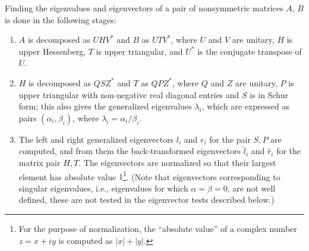\dent
Finding the eigenvalues and eigenvectors of a pair of nonsymmetric
matrices $A$, $B$ is done in the following stages:
\begin{enumerate}

\item $A$ is decomposed as $U H V^*$ and
      $B$ as $U T V^*$, where $U$ and $V$ are unitary,
      $H$ is upper Hessenberg,
      $T$ is upper triangular,
      and $U^*$ is the conjugate transpose of $U$.

\item $H$ is decomposed as $Q S Z^*$ and $T$ as $Q P Z^*$,
      where $Q$ and $Z$ are unitary,
      $P$ is upper triangular with non-negative real diagonal entries
      and $S$ is in Schur form;
      this also gives the generalized eigenvalues
      $\lambda_i$, which are expressed as pairs $(\alpha_i,\beta_i)$,
      where $\lambda_i = \alpha_i/\beta_i$.

\item The left and right generalized eigenvectors $l_i$ and $r_i$
      for the pair $S, P$ are computed,
      and from them the back-transformed eigenvectors
      $\hat{l}_i$ and $\hat{r}_i$ for the matrix pair $H, T$.
      The eigenvectors are normalized so that their largest element
      has absolute value $1$\footnote{For the purpose of normalization,
		the ``absolute value'' of a complex number
		$z=x+iy$ is computed
		as $\left|x\right|+\left|y\right|$.}.
      (Note that eigenvectors corresponding to singular eigenvalues,
      i.e., eigenvalues for which $\alpha=\beta=0$, are not well
      defined, these are not tested in the eigenvector tests described
      below.)

\end{enumerate}

